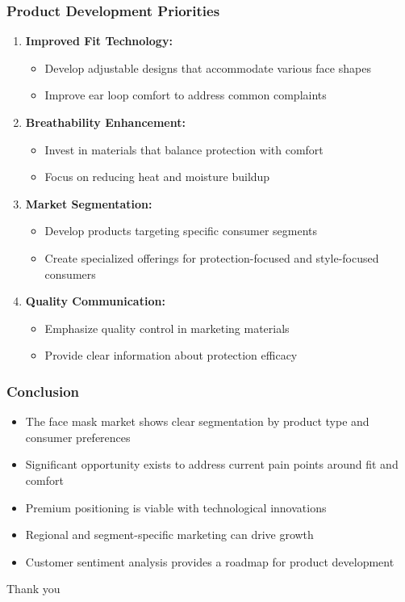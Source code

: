 \documentclass[aspectratio=169]{beamer}
\begin{document}
\begin{frame}
\frametitle{Product Development Priorities}
\begin{enumerate}
    \item \textbf{Improved Fit Technology:} 
        \begin{itemize}
            \item Develop adjustable designs that accommodate various face shapes
            \item Improve ear loop comfort to address common complaints
        \end{itemize}
    \item \textbf{Breathability Enhancement:} 
        \begin{itemize}
            \item Invest in materials that balance protection with comfort
            \item Focus on reducing heat and moisture buildup
        \end{itemize}
    \item \textbf{Market Segmentation:}
        \begin{itemize}
            \item Develop products targeting specific consumer segments
            \item Create specialized offerings for protection-focused and style-focused consumers
        \end{itemize}
    \item \textbf{Quality Communication:}
        \begin{itemize}
            \item Emphasize quality control in marketing materials
            \item Provide clear information about protection efficacy
        \end{itemize}
\end{enumerate}
\end{frame}

\begin{frame}
\frametitle{Conclusion}
\begin{itemize}
    \item The face mask market shows clear segmentation by product type and consumer preferences
    \item Significant opportunity exists to address current pain points around fit and comfort
    \item Premium positioning is viable with technological innovations
    \item Regional and segment-specific marketing can drive growth
    \item Customer sentiment analysis provides a roadmap for product development
\end{itemize}

\vspace{1cm}
\centering
\Large{Thank you}
\end{frame}
\end{document}
